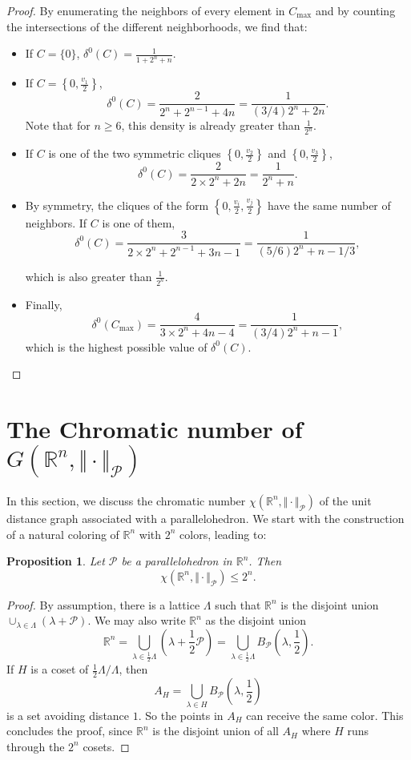 \documentclass{amsart}                     %
\newtheorem{prop}{Proposition}
\newcommand{\R}{{\mathbb R}}
\begin{document}
\begin{proof}
By enumerating the neighbors of every element in $C_{\max}$ and by counting the intersections of the different neighborhoods, we find that:

\begin{itemize}
\item If $C=\{0\}$, %
$\delta^0(C)=\frac{1}{1+2^n+n}$.
\item If $C=\left\{0,\frac {v_1} 2\right\}$, 
$$ \delta^0(C)=\frac{2}{2^n + 2^{n-1} +4n}=\frac{1}{(3/4)2^{n} +2n}. $$
Note that for $n\geq 6$, this density is already greater than $\frac{1}{2^n}$.
\item If $C$ is one of the two symmetric cliques $\left\{0,\frac{v_2} 2\right\}$ and $\left\{0,\frac{v_3} 2 \right\}$,
$$ \delta^0(C)=\frac{2}{ 2\times2^n + 2n}= \frac{1}{ 2^n + n}. $$
\item By symmetry, the cliques of the form $\left\{0,\frac{v_i} 2,\frac{v_j} 2\right\}$  have the same number of neighbors. If $C$ is one of them, 
$$ \delta^0(C)=\frac{3}{2\times 2^n + 2^{n-1} + 3n -1 } = \frac{1}{(5/6)2^n + n - 1/3 } ,$$

which is also greater than $\frac{1}{2^n}$.

\item Finally, 
$$ \delta^0(C_{\max})=\frac{4}{3\times 2^n + 4n - 4} = \frac{1}{{(3/{4})2^n+n-1}}, $$
which is the highest possible value of $\delta^0(C)$.
\end{itemize} 
\end{proof}

\section{The Chromatic number of $G(\R^n,\Vert\cdot\Vert_{\mathcal P})$}\label{SecChi}
In this section, we discuss the chromatic number 
$\chi(\R^n,\Vert \cdot \Vert_\mathcal{P})$ of the unit distance graph associated with a parallelohedron.
We start with the  construction of  a natural coloring of $\R^n$ with $2^n$ colors, leading to:
\begin{prop}
Let $\mathcal{P}$ be a parallelohedron in $\R^n$. Then 
$$ \chi(\R^n,\Vert \cdot \Vert_\mathcal{P})\leq 2^n. $$
\end{prop}
\begin{proof}
By assumption, there is a lattice $\Lambda$ such that $\R^n$ is the disjoint union $\cup_{\lambda \in \Lambda} (\lambda + \mathcal{P})$. We may also write $\R^n$ as the disjoint union 
$$\R^n=\bigcup_{\lambda \in \frac{1}{2}\Lambda} \left(\lambda + \frac{1}{2}\mathcal{P}\right)=\bigcup_{\lambda \in \frac{1}{2}\Lambda} B_\mathcal{P}\left(\lambda,\frac{1}{2}\right). $$
If $H$ is a coset of $\frac{1}{2} \Lambda\Big/ \Lambda$, then 
$$A_H=\bigcup_{\lambda \in H} B_\mathcal{P}\left(\lambda,\frac{1}{2}\right) $$
is a set avoiding distance $1$. So  the points in $A_H$ can receive the same color. This concludes the proof, since $\R^n$ is the disjoint union of all $A_H$ where $H$ runs through the $2^n$ cosets. 
\end{proof}
\end{document}
